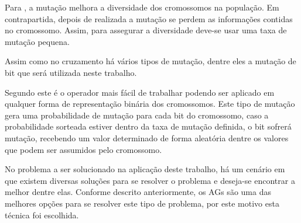 \par Para , a mutação melhora a
diversidade dos cromossomos na população. Em contrapartida, depois de realizada
a mutação se perdem as informações contidas no cromossomo. Assim, para assegurar
a diversidade deve-se usar uma taxa de mutação pequena. 


\par Assim como no cruzamento há vários tipos de mutação, dentre eles a mutação
de bit que será utilizada neste trabalho.

\par Segundo  este é o operador
mais fácil de trabalhar podendo ser aplicado em qualquer forma de representação
binária dos cromossomos. Este tipo de mutação gera uma probabilidade de mutação
para cada bit do cromossomo, caso a probabilidade sorteada estiver dentro da
taxa de mutação definida, o bit sofrerá mutação, recebendo um valor determinado
de forma aleatória dentre os valores que podem ser assumidos pelo cromossomo.


\par No problema a ser solucionado na aplicação deste trabalho, há um
cenário em que existem diversas soluções para se resolver o problema e deseja-se
encontrar a melhor dentre elas. Conforme descrito anteriormente, os AGs são uma
das melhores opções para se resolver este tipo de problema, por este motivo esta técnica foi escolhida.

% 


